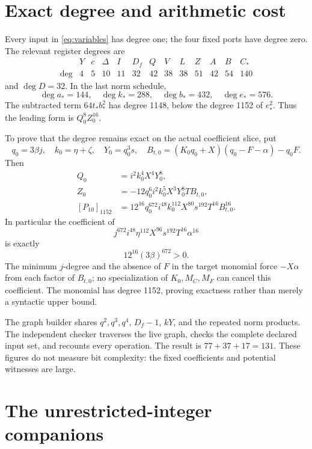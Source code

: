 \documentclass[11pt]{article}
\theoremstyle{remark}
\begin{document}
\section{Exact degree and arithmetic cost}

Every input in \eqref{eq:variables} has degree one; the four fixed ports
have degree zero. The relevant register degrees are
\[
\begin{array}{c|rrrrrrrrrrrr}
 &Y&c&\Delta&I&D_f&Q&V&L&Z&A&B&C_*\\\hline
\deg&4&5&10&11&32&42&38&38&51&42&54&140
\end{array}
\]
and $\deg D=32$. In the last norm schedule,
\[
 \deg a_*=144,\quad \deg k_*=288,\quad
 \deg b_*=432,\quad \deg e_*=576.
\]
The subtracted term $64t_*b_*^2$ has degree 1148, below the degree 1152
of $e_*^2$. Thus the leading form is $Q_0^8Z_0^{16}$.

To prove that the degree remains exact on the actual coefficient slice,
put
\[
 q_0=3\beta j,\quad k_0=\eta+\zeta,\quad Y_0=q_0^3s,
 \quad B_{t,0}=(K_0q_0+X)(q_0-F-\alpha)-q_0F.
\]
Then
\begin{align*}
 Q_0&=i^2k_0^4X^4Y_0^8,\\
 Z_0&=-12q_0^6i^2k_0^5X^3Y_0^8T B_{t,0},\\
 [P_{10}]_{1152}
 &=12^{16}q_0^{672}i^{48}k_0^{112}X^{80}s^{192}T^{16}B_{t,0}^{16}.
\end{align*}
In particular the coefficient of
\begin{equation}\label{eq:monomial}
 j^{672}i^{48}\eta^{112}X^{96}s^{192}T^{16}\alpha^{16}
\end{equation}
is exactly
\[
 12^{16}(3\beta)^{672}>0.
\]
The minimum $j$-degree and the absence of $F$ in the target monomial
force $-X\alpha$ from each factor of $B_{t,0}$;
no specialization of $K_0,M_C,M_F$ can cancel this coefficient. The
monomial has degree 1152, proving exactness rather than merely a syntactic
upper bound.

The graph builder shares $q^2,q^3,q^4$, $D_f-1$, $kY$, and the repeated
norm products. The independent checker traverses the live graph, checks
the complete declared input set, and recounts every operation. The result
is $77+37+17=131$. These figures do not measure bit complexity: the
fixed coefficients and potential witnesses are large.

\section{The unrestricted-integer companions}\label{sec:integer}
\end{document}
